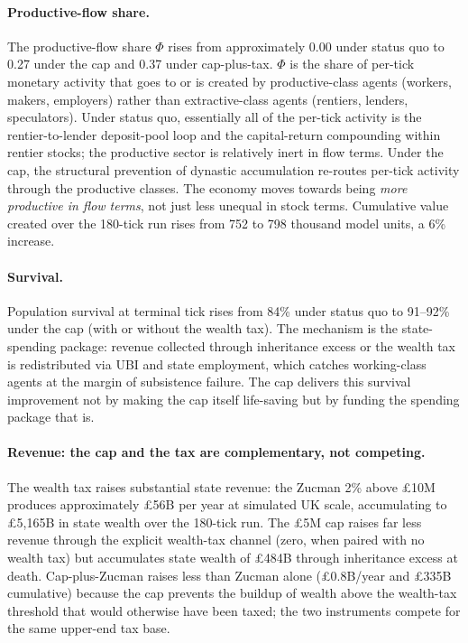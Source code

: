 \documentclass[11pt]{article}
\begin{document}
\paragraph{Productive-flow share.}  The productive-flow share
$\Phi$ rises from approximately 0.00 under status quo to 0.27
under the cap and 0.37 under cap-plus-tax.  $\Phi$ is the share of
per-tick monetary activity that goes to or is created by
productive-class agents (workers, makers, employers) rather than
extractive-class agents (rentiers, lenders, speculators).  Under
status quo, essentially all of the per-tick activity is the
rentier-to-lender deposit-pool loop and the capital-return
compounding within rentier stocks; the productive sector is
relatively inert in flow terms.  Under the cap, the structural
prevention of dynastic accumulation re-routes per-tick activity
through the productive classes.  The economy moves towards being
\emph{more productive in flow terms}, not just less unequal in
stock terms.  Cumulative value created over the 180-tick run rises
from 752 to 798 thousand model units, a 6\% increase.

\paragraph{Survival.}  Population survival at terminal tick rises
from 84\% under status quo to 91--92\% under the cap (with or
without the wealth tax).  The mechanism is the state-spending
package: revenue collected through inheritance excess or the
wealth tax is redistributed via UBI and state employment, which
catches working-class agents at the margin of subsistence
failure.  The cap delivers this survival improvement not by
making the cap itself life-saving but by funding the spending
package that is.

\paragraph{Revenue: the cap and the tax are complementary, not
competing.}  The wealth tax raises substantial state revenue:
the Zucman 2\% above \pounds 10M produces approximately
\pounds 56B per year at simulated UK scale, accumulating to
\pounds 5{,}165B in state wealth over the 180-tick run.  The
\pounds 5M cap raises far less revenue through the explicit
wealth-tax channel (zero, when paired with no wealth tax) but
accumulates state wealth of \pounds 484B through inheritance
excess at death.  Cap-plus-Zucman raises less than Zucman alone
(\pounds 0.8B/year and \pounds 335B cumulative) because the cap
prevents the buildup of wealth above the wealth-tax threshold that
would otherwise have been taxed; the two instruments compete for
the same upper-end tax base.
\end{document}
